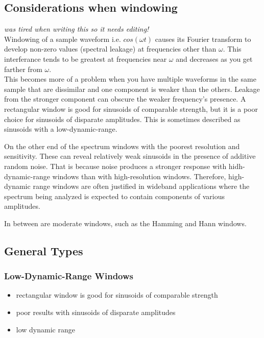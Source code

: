 \documentclass{article}
\begin{document}
\subsection*{Considerations when windowing}
\textit{was tired when writing this so it needs editing!} \\

Windowing of a sample waveform i.e. $cos(\omega t)$ causes its Fourier transform to develop non-zero values (spectral leakage) at frequencies other than $\omega$. This interferance tends to be greatest at frequencies near $\omega$ and decreases as you get farther from $\omega$. \\

This becomes more of a problem when you have multiple waveforms in the same sample that are dissimilar and one component is weaker than the others. Leakage from the stronger component can obscure the weaker frequency's presence. A rectangular window is good for sinusoids of comparable strength, but it is a poor choice for sinusoids of disparate amplitudes. This is sometimes described as sinusoids with a low-dynamic-range.

On the other end of the spectrum windows with the poorest resolution and sensitivity. These can reveal relatively weak sinusoids in the presence of additive random noise. That is because noise produces a stronger response with hidh-dynamic-range windows than with high-resolution windows. Therefore, high-dynamic range windows are often justified in wideband applications where the spectrum being analyzed is expected to contain components of various amplitudes.

In between are moderate windows, such as the Hamming and Hann windows. 

\subsection*{General Types}
\subsubsection*{Low-Dynamic-Range Windows}
\begin{itemize}
	\item rectangular window is good for sinusoids of comparable strength
	\item poor results with sinusoids of disparate amplitudes
	\item low dynamic range
\end{itemize}
\end{document}
